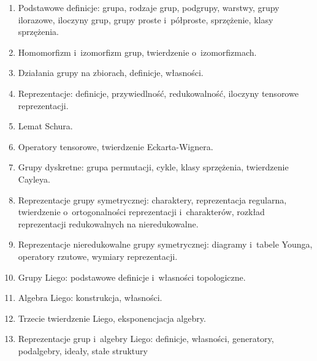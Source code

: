 \documentclass[a4paper,11pt]{article}
\begin{document}
\begin{enumerate}

\item Podstawowe definicje: grupa, rodzaje grup, podgrupy, warstwy, grupy
  ilorazowe, iloczyny grup, grupy proste i~półproste, sprzężenie, klasy
  sprzężenia.



\item Homomorfizm i~izomorfizm grup, twierdzenie o~izomorfizmach.



\item Działania grupy na zbiorach, definicje, własności.



\item Reprezentacje: definicje, przywiedlność, redukowalność, iloczyny
  tensorowe reprezentacji.



\item Lemat Schura.



\item Operatory tensorowe, twierdzenie Eckarta-Wignera.



\item Grupy dyskretne: grupa permutacji, cykle, klasy sprzężenia,
  twierdzenie Cayleya.



\item Reprezentacje grupy symetrycznej: charaktery, reprezentacja
  regularna, twierdzenie o~ortogonalności reprezentacji i~charakterów,
  rozkład reprezentacji redukowalnych na nieredukowalne.


\item Reprezentacje nieredukowalne grupy symetrycznej: diagramy i~tabele
  Younga, operatory rzutowe, wymiary reprezentacji.



\item Grupy Liego: podstawowe definicje i~własności topologiczne.



\item Algebra Liego: konstrukcja, własności.



\item Trzecie twierdzenie Liego, eksponencjacja algebry.



\item Reprezentacje grup i~algebry Liego: definicje, własności, generatory,
  podalgebry, ideały, stałe struktury




\end{enumerate}
\end{document}
